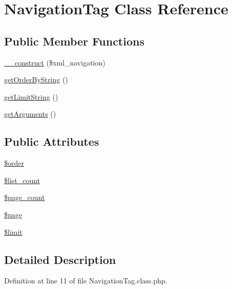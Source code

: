 \hypertarget{classNavigationTag}{\section{Navigation\-Tag Class Reference}
\label{classNavigationTag}
}
\subsection*{Public Member Functions}
\begin{DoxyCompactItemize}
\item 
\hyperlink{classNavigationTag_a20c8544ee1a5d7ce5ec12931309bf3c3}{\-\_\-\-\_\-construct} (\$xml\-\_\-navigation)
\item 
\hyperlink{classNavigationTag_a5d0ad196e149753b1adb58a1883f369d}{get\-Order\-By\-String} ()
\item 
\hyperlink{classNavigationTag_a9adb174f58ed2ef92137970d0a7b2c81}{get\-Limit\-String} ()
\item 
\hyperlink{classNavigationTag_a05afcf00355b39311b716e35e68789a6}{get\-Arguments} ()
\end{DoxyCompactItemize}
\subsection*{Public Attributes}
\begin{DoxyCompactItemize}
\item 
\hyperlink{classNavigationTag_a67fea0de20a4e7bf16df396c69171799}{\$order}
\item 
\hyperlink{classNavigationTag_a0d79757d75c3a0cfc3d38db7346349a4}{\$list\-\_\-count}
\item 
\hyperlink{classNavigationTag_a1aaaffcb475c1edc0a93539c59a92ce9}{\$page\-\_\-count}
\item 
\hyperlink{classNavigationTag_a095ee63f01c7ae4c6e66854521c88371}{\$page}
\item 
\hyperlink{classNavigationTag_a322d95f82cadac06f257815e2bcc28a3}{\$limit}
\end{DoxyCompactItemize}


\subsection{Detailed Description}


Definition at line 11 of file Navigation\-Tag.\-class.\-php.



